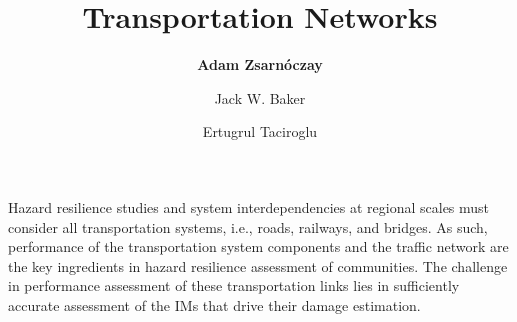 %
%
%


%
%
%
%
%
%
%
%

\title{Transportation Networks}
\author{
    \textbf{Adam Zsarnóczay}
    \and Jack W. Baker
    \and Ertugrul Taciroglu}
\tocauthor{}
%
%
\maketitle

Hazard resilience studies and system interdependencies at regional scales must consider all transportation systems, i.e., roads, railways, and bridges. As such, performance of the transportation system components and the traffic network are the key ingredients in hazard resilience assessment of communities. The challenge in performance assessment of these transportation links lies in sufficiently accurate assessment of the IMs that drive their damage estimation.
 
